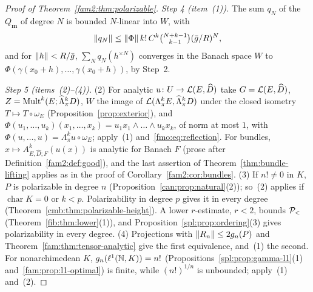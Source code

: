 \begin{proof}[Proof of Theorem~\ref{fam2:thm:polarizable}]
\emph{Step 4 (item~(1)).} The sum $q_N$ of the $Q_{\mathbf m}$ of degree $N$ is bounded $N$-linear into $W$, with
\begin{equation}\label{fmo:eq:reflection}
 \lVert q_N\rVert\le\lVert \Phi\rVert\,k!\,C^k\tbinom{N+k-1}{k-1}(\bar g/R)^N ,
\end{equation}
and for $\lVert h\rVert<R/\bar g$, $\sum_Nq_N(h^{\times N})$ converges in the Banach space $W$ to $\Phi(\gamma(x_0+h),\dots,
\gamma(x_0+h))$, by Step~2.

\emph{Step 5 (items~(2)--(4)).} (2) For analytic $u\colon U\to\mathcal L(E,\widehat D)$ take $G=\mathcal L(E,\widehat D)$,
$Z=\operatorname{Mult}^k(E;\widehat\Lambda^k_\pi D)$, $W$ the image of $\mathcal L(\Lambda^k_\pi E,\widehat\Lambda^k_\pi D)$ under the closed isometry
$T\mapsto T\circ\omega_E$ (Proposition~\ref{prop:exterior}), and $\Phi(u_1,\dots,u_k)(x_1,\dots,x_k)=u_1x_1\wedge\dots\wedge
u_kx_k$, of norm at most $1$, with $\Phi(u,\dots,u)=\Lambda^k_\pi u\circ\omega_E$; apply~(1) and~\eqref{fmo:eq:reflection}.
For bundles, $x\mapsto A^k_{E,\widehat D;F}(u(x))$ is analytic for Banach $F$ (prose after Definition~\ref{fam2:def:good}),
and the last assertion of Theorem~\ref{thm:bundle-lifting} applies as in the proof of Corollary~\ref{fam2:cor:bundles}.
(3) If $n!\ne0$ in $K$, $P$
is polarizable in degree $n$ (Proposition~\ref{can:prop:natural}(2)); so~(2) applies if $\operatorname{char}K=0$ or
$k<p$. Polarizability in
degree $p$ gives it in every degree (Theorem~\ref{cmb:thm:polarizable-height}). A lower $r$-estimate, $r<2$, bounds
$\mathcal P_<$ (Theorem~\ref{fib:thm:lower}(1)), and Proposition~\ref{spl:prop:ordering}(3) gives polarizability in every degree.
(4) Projections with $\lVert R_n\rVert\le2g_n(P)$ and Theorem~\ref{fam:thm:tensor-analytic} give the first equivalence, and~(1)
the second. For nonarchimedean $K$, $g_n(\ell^1(\mathbb N,K))=n!$ (Propositions~\ref{spl:prop:gamma-l1}(1)
and~\ref{fam:prop:l1-optimal}) is finite, while $(n!)^{1/n}$ is unbounded; apply~(1) and~(2).
\end{proof}

